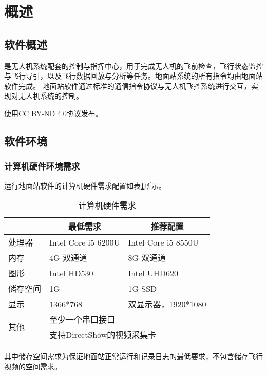 
\section{概述}
\subsection{软件概述}

\csciname 是\cscidem 无人机系统配套的控制与指挥中心，用于完成无人机的飞前检查，飞行状态监控与飞行导引，以及飞行数据回放与分析等任务。地面站系统的所有指令均由地面站软件完成。
地面站软件通过标准的通信指令协议与无人机飞控系统进行交互，实现对无人机系统的控制。

\csciname 使用CC BY-ND 4.0协议发布。

\subsection{软件环境}
\subsubsection{计算机硬件环境需求}
运行地面站软件的计算机硬件需求配置如表\ref{t3req}所示。

\begin{table}[ht]
\centering
\caption{计算机硬件需求}
\label{t3req}
\begin{tabular}{|l|l|l|}
\hline
\multicolumn{1}{|c|}{ } & \multicolumn{1}{c|}{最低需求} & \multicolumn{1}{c|}{推荐配置} \\ \hline
处理器                      & Intel Core i5 6200U     & Intel Core i5 8550U       \\ \hline
内存                       & 4G 双通道              &8G 双通道         \\ \hline
图形                       & Intel HD530        &Intel UHD620       \\ \hline
储存空间                     & 1G               &1G SSD     \\ \hline
显示                       & 1366*768 &双显示器，1920*1080       \\ \hline
\multirow{2}{*}{其他}      & \multicolumn{2}{l|}{至少一个串口接口}                 \\ \cline{2-3} 
                         & \multicolumn{2}{l|}{支持DirectShow的视频采集卡}        \\ \hline
\end{tabular}
\end{table}

其中储存空间需求为保证地面站正常运行和记录日志的最低要求，不包含储存飞行视频的空间需求。

